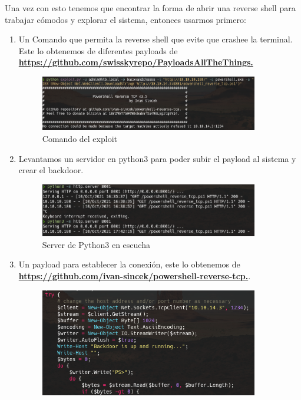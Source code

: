 \documentclass{article}
\begin{document}
Una vez con esto tenemos que encontrar la forma de abrir una reverse shell para trabajar cómodos y explorar el sistema, entonces usarmos primero:
\begin{enumerate}
	\item Un Comando que permita la reverse shell que evite que crashee la terminal. Este lo obtenemos de diferentes payloads de \textbf{\href{https://github.com/swisskyrepo/PayloadsAllTheThings/blob/master/Methodology\%20and\%20Resources/Reverse\%20Shell\%20Cheatsheet.md\#powershell}{https://github.com/swisskyrepo/PayloadsAllTheThings.}}
	\begin{figure}[h]
		\center
		\includegraphics[width=0.9\textwidth]{images/remote/exploit.png}
		\caption{Comando del exploit}
	\end{figure}
	\item Levantamos un servidor en python3 para poder subir el payload al sistema y crear el backdoor.
	\begin{figure}[h]
		\center
		\includegraphics[width=0.9\textwidth]{images/remote/server-python.png}
		\caption{Server de Python3 en escucha}
	\end{figure}
	\item Un payload para establecer la conexión, este lo obtenemos de \textbf{\href{https://github.com/ivan-sincek/powershell-reverse-tcp/blob/master/src/powershell_bind_tcp.ps1}{https://github.com/ivan-sincek/powershell-reverse-tcp.}}.
	\begin{figure}[h]
		\center
		\includegraphics[width=0.9\textwidth]{images/remote/payload.png}

\end{figure}
\end{enumerate}
\end{document}
